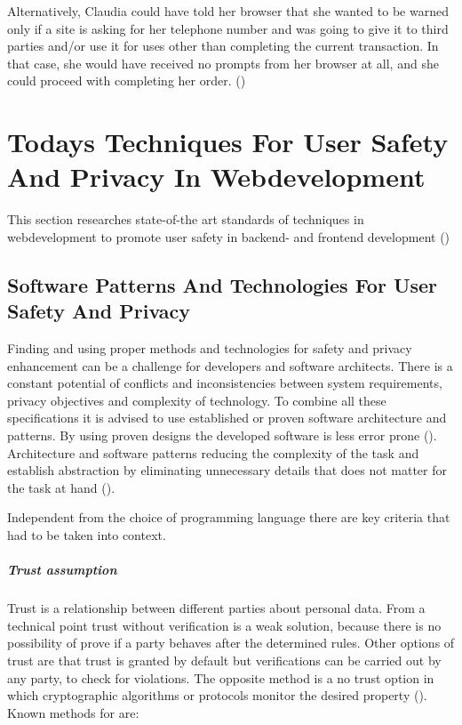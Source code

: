 Alternatively, Claudia could have told her browser that she wanted to be warned only if a site is asking for her telephone number and was going to give it to third parties and/or use it for uses other than completing the current transaction. In that case, she would have received no prompts from her browser at all, and she could proceed with completing her order. (\cite{wenning2006platform})


\section{Todays Techniques For User Safety And Privacy In Webdevelopment}
\label{section:Introduction}
This section researches state-of-the art standards of techniques in webdevelopment to promote user safety in backend- and frontend development (\cite{Keerthi2014})

\subsection{Software Patterns And Technologies For User Safety And Privacy}
Finding and using proper methods and technologies for safety and privacy enhancement can be a challenge for developers and software architects. There is a constant potential of conflicts and inconsistencies between system requirements, privacy objectives and complexity of technology. To combine all these specifications it is advised to use established or proven software architecture and patterns. By using proven designs the developed software is less error prone (\cite{danezis2015privacy}). Architecture and software patterns reducing the complexity of the task and establish abstraction by eliminating unnecessary details that does not matter for the task at hand (\cite{antignac2014privacy}).

Independent from the choice of programming language there are key criteria that had to be taken into context.

\subparagraph{Trust assumption} Trust is a relationship between different parties about personal data. From a technical point trust without verification is a weak solution, because there is no possibility of prove if a party behaves after the determined rules. Other options of trust are that trust is granted by default but verifications can be carried out by any party, to check for violations. The opposite method is a no trust option in which cryptographic algorithms or protocols monitor the desired property (\cite{antignac2014privacy}). Known methods for are:

